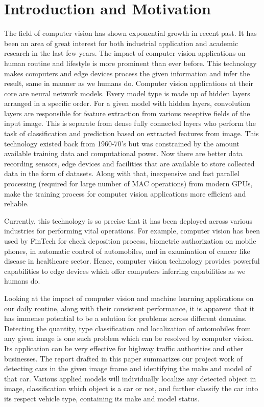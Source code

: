 \documentclass[conference]{IEEEtran}
\begin{document}
\section{Introduction and Motivation} \label{Introduction}
	The field of computer vision has shown exponential growth in recent past. It has been an area of great interest for both industrial application and academic research in the last few years. The impact of computer vision applications on human routine and lifestyle is more prominent than ever before. This technology makes computers and edge devices process the given information and infer the result, same in manner as we humans do. Computer vision applications at their core are neural network models. Every model type is made up of hidden layers arranged in a specific order. For a given model with hidden layers, convolution layers are responsible for feature extraction from various receptive fields of the input image. This is separate from dense fully connected layers who perform the task of classification and prediction based on extracted features from image. This technology existed back from 1960-70's but was constrained by the amount available training data and computational power. Now there are better data recording sensors, edge devices and facilities that are available to store collected data in the form of datasets. Along with that, inexpensive and fast parallel processing (required for large number of MAC operations) from modern GPUs, make the training process for computer vision applications more efficient and reliable.   

 	Currently, this technology is so precise that it has been deployed across various industries for performing vital operations. For example, computer vision has been used by FinTech for check deposition process, biometric authorization on mobile phones, in automatic control of automobiles, and in examination of cancer like disease in healthcare sector. Hence, computer vision technology provides powerful capabilities to edge devices which offer computers inferring capabilities as we humans do.  

	Looking at the impact of computer vision and machine learning applications on our daily routine, along with their consistent performance, it is apparent that it has immense potential to be a solution for problems across different domains. Detecting the quantity, type classification and localization of automobiles from any given image is one such problem which can be resolved by computer vision. Its application can be very effective for highway traffic authorities and other businesses. The report drafted in this paper summarizes our project work of detecting cars in the given image frame and identifying the make and model of that car. Various applied models will individually localize any detected object in image, classification which object is a car or not, and further classify the car into its respect vehicle type, containing its make and model status.    
\end{document}
